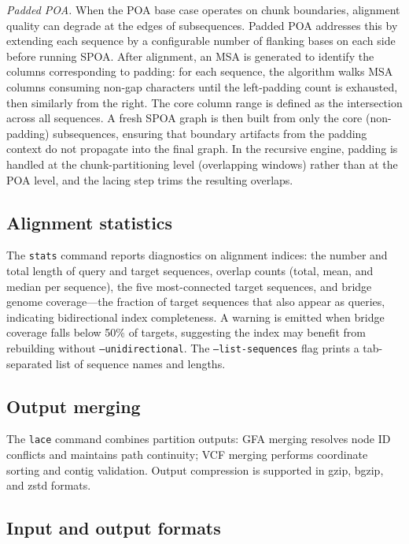 \noindent\textit{Padded POA.} When the POA base case operates on chunk boundaries, alignment quality can degrade at the edges of subsequences. Padded POA addresses this by extending each sequence by a configurable number of flanking bases on each side before running SPOA. After alignment, an MSA is generated to identify the columns corresponding to padding: for each sequence, the algorithm walks MSA columns consuming non-gap characters until the left-padding count is exhausted, then similarly from the right. The core column range is defined as the intersection across all sequences. A fresh SPOA graph is then built from only the core (non-padding) subsequences, ensuring that boundary artifacts from the padding context do not propagate into the final graph. In the recursive engine, padding is handled at the chunk-partitioning level (overlapping windows) rather than at the POA level, and the lacing step trims the resulting overlaps.

\subsection*{Alignment statistics}

The \texttt{stats} command reports diagnostics on alignment indices: the number and total length of query and target sequences, overlap counts (total, mean, and median per sequence), the five most-connected target sequences, and bridge genome coverage---the fraction of target sequences that also appear as queries, indicating bidirectional index completeness. A warning is emitted when bridge coverage falls below 50\% of targets, suggesting the index may benefit from rebuilding without \texttt{--unidirectional}. The \texttt{--list-sequences} flag prints a tab-separated list of sequence names and lengths.

\subsection*{Output merging}

The \texttt{lace} command combines partition outputs: GFA merging resolves node ID conflicts and maintains path continuity; VCF merging performs coordinate sorting and contig validation. Output compression is supported in gzip, bgzip, and zstd formats.

\subsection*{Input and output formats}

